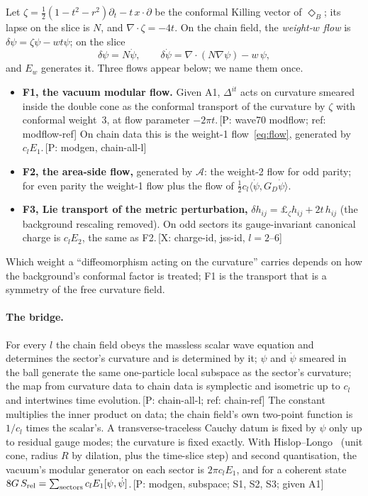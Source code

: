 \documentclass[11pt]{article}
\makeatletter
\newcommand{\cA}{\mathcal{A}}
\newcommand{\Srel}{S_{\rm rel}}
\newcommand{\GD}{G_{\!D}}
\newcommand{\diam}{\Diamond_B}
\newcommand{\ip}[2]{\langle #1,#2\rangle}
\newcommand{\ev}[1]{\,{\textsf{\scriptsize[#1]}}}
\renewcommand\section{\@startsection{section}{1}{\z@}{-2.4ex \@plus -1ex \@minus -.2ex}{1.2ex \@plus .2ex}{\normalfont\Large\bfseries}}
\makeatother
\begin{document}
\section{Setting: flows and the vacuum generator}\label{sec:setting}

Let $\zeta=\frac12(1-t^2-r^2)\partial_t-t\,x\!\cdot\!\partial$ be the conformal Killing vector of $\diam$; its lapse on the slice is $N$, and $\nabla\!\cdot\zeta=-4t$. On the chain field, the \emph{weight-$w$ flow} is $\delta\psi=\zeta\psi-wt\psi$; on the slice
\begin{equation}\label{eq:flow}
\delta\psi=N\dot\psi,\qquad \delta\dot\psi=\nabla\!\cdot(N\nabla\psi)-w\,\psi ,
\end{equation}
and $E_w$ generates it. Three flows appear below; we name them once.
\begin{itemize}\itemsep1pt
\item \textbf{F1, the vacuum modular flow.} Given A1, $\Delta^{it}$ acts on curvature smeared inside the double cone as the conformal transport of the curvature by $\zeta$ with conformal weight~3, at flow parameter $-2\pi t$.\ev{P: wave70 modflow; ref: modflow-ref} On chain data this is the weight-1 flow~\eqref{eq:flow}, generated by $c_lE_1$.\ev{P: modgen, chain-all-l}
\item \textbf{F2, the area-side flow,} generated by $\cA$: the weight-2 flow for odd parity; for even parity the weight-1 flow plus the flow of $\frac12c_l\ip{\dot\psi}{\GD\dot\psi}$.
\item \textbf{F3, Lie transport of the metric perturbation,} $\delta h_{ij}=\pounds_\zeta h_{ij}+2t\,h_{ij}$ (the background rescaling removed). On odd sectors its gauge-invariant canonical charge is $c_lE_2$, the same as F2.\ev{X: charge-id, jss-id, $l=2$--$6$}
\end{itemize}
Which weight a ``diffeomorphism acting on the curvature'' carries depends on how the background's conformal factor is treated; F1 is the transport that is a symmetry of the free curvature field.

\paragraph{The bridge.} For every $l$ the chain field obeys the massless scalar wave equation and determines the sector's curvature and is determined by it; $\psi$ and $\dot\psi$ smeared in the ball generate the same one-particle local subspace as the sector's curvature; the map from curvature data to chain data is symplectic and isometric up to $c_l$ and intertwines time evolution.\ev{P: chain-all-l; ref: chain-ref} The constant multiplies the inner product on data; the chain field's own two-point function is $1/c_l$ times the scalar's. A transverse-traceless Cauchy datum is fixed by $\psi$ only up to residual gauge modes; the curvature is fixed exactly. With Hislop--Longo~\cite{HL} (unit cone, radius $R$ by dilation, plus the time-slice step) and second quantisation, the vacuum's modular generator on each sector is $2\pi c_lE_1$, and for a coherent state $8G\,\Srel=\sum_{\rm sectors}c_lE_1[\psi,\dot\psi]$.\ev{P: modgen, subspace; S1, S2, S3; given A1}
\end{document}
